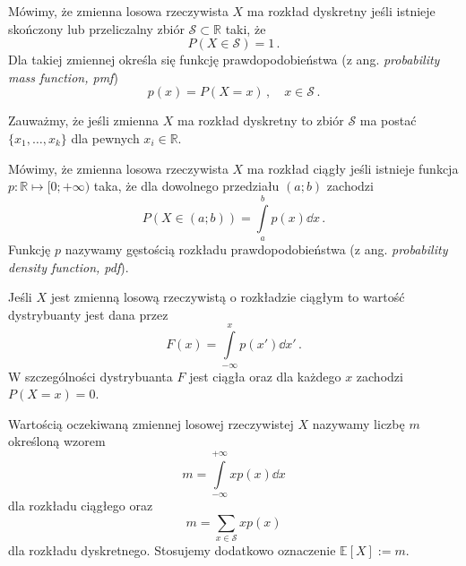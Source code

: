 \documentclass{myclass}
\numberwithin{equation}{subsection}
\begin{document}
\begin{definition}
Mówimy, że zmienna losowa rzeczywista \(X\) ma rozkład dyskretny jeśli istnieje skończony lub
przeliczalny zbiór \(\mathcal{S} \subset \mathbb{R}\) taki, że
\begin{equation*}
    P( X \in \mathcal{S} ) = 1\,.
\end{equation*}
Dla takiej zmiennej określa się funkcję prawdopodobieństwa (z ang. \textit{probability mass
function, pmf})
\begin{equation*}
    p(x) = P(X = x)\,,\quad x \in \mathcal{S}\,.
\end{equation*}
\end{definition}

Zauważmy, że jeśli zmienna \(X\) ma rozkład dyskretny to zbiór \(\mathcal{S}\) ma postać
\(\{x_1,\ldots,x_k\}\) dla pewnych \(x_i \in \mathbb{R}\).

\begin{definition}
Mówimy, że zmienna losowa rzeczywista \(X\) ma rozkład ciągły jeśli istnieje funkcja \(p: \mathbb{R}
\mapsto [0; +\infty)\) taka, że dla dowolnego przedziału \((a;b)\) zachodzi
\begin{equation*}
    P(X \in (a;b)) = \int\limits_a^b p(x) \dd{x}\,.
\end{equation*}
Funkcję \(p\) nazywamy gęstością rozkładu prawdopodobieństwa (z ang. \textit{probability density
function, pdf}).
\end{definition}

Jeśli \(X\) jest zmienną losową rzeczywistą o rozkładzie ciągłym to wartość dystrybuanty jest dana
przez
\begin{equation}
    F(x) = \int\limits_{-\infty}^x p(x') \dd{x'}\,.
\end{equation}
W szczególności dystrybuanta \(F\) jest ciągła oraz dla każdego \(x\) zachodzi \(P(X = x) = 0\).

\begin{definition}
Wartością oczekiwaną zmiennej losowej rzeczywistej \(X\) nazywamy liczbę \(m\) określoną wzorem
\begin{equation*}
    m = \int\limits_{-\infty}^{+\infty} x p(x) \dd{x}
\end{equation*}
dla rozkładu ciągłego oraz
\begin{equation*}
    m = \sum_{x \in \mathcal{S}} x p(x)
\end{equation*}
dla rozkładu dyskretnego. Stosujemy dodatkowo oznaczenie \(\mathbb{E}[X] := m\).
\end{definition}
\end{document}
